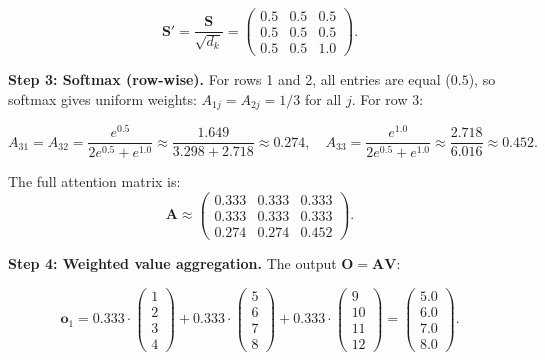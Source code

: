 \begin{equation}
\mathbf{S}' = \frac{\mathbf{S}}{\sqrt{d_k}} = \begin{pmatrix} 0.5 & 0.5 & 0.5 \\ 0.5 & 0.5 & 0.5 \\ 0.5 & 0.5 & 1.0 \end{pmatrix}.
\end{equation}

\textbf{Step 3: Softmax (row-wise).} For rows 1 and 2, all entries are equal ($0.5$), so softmax gives uniform weights: $A_{1j} = A_{2j} = 1/3$ for all $j$. For row 3:

\begin{equation}
A_{31} = A_{32} = \frac{e^{0.5}}{2e^{0.5} + e^{1.0}} \approx \frac{1.649}{3.298 + 2.718} \approx 0.274, \quad
A_{33} = \frac{e^{1.0}}{2e^{0.5} + e^{1.0}} \approx \frac{2.718}{6.016} \approx 0.452.
\end{equation}

The full attention matrix is:
\begin{equation}
\mathbf{A} \approx \begin{pmatrix} 0.333 & 0.333 & 0.333 \\ 0.333 & 0.333 & 0.333 \\ 0.274 & 0.274 & 0.452 \end{pmatrix}.
\end{equation}

\textbf{Step 4: Weighted value aggregation.} The output $\mathbf{O} = \mathbf{A}\mathbf{V}$:

\begin{equation}
\mathbf{o}_1 = 0.333 \cdot \begin{pmatrix}1\\2\\3\\4\end{pmatrix} + 0.333 \cdot \begin{pmatrix}5\\6\\7\\8\end{pmatrix} + 0.333 \cdot \begin{pmatrix}9\\10\\11\\12\end{pmatrix} = \begin{pmatrix}5.0\\6.0\\7.0\\8.0\end{pmatrix}.
\end{equation}

